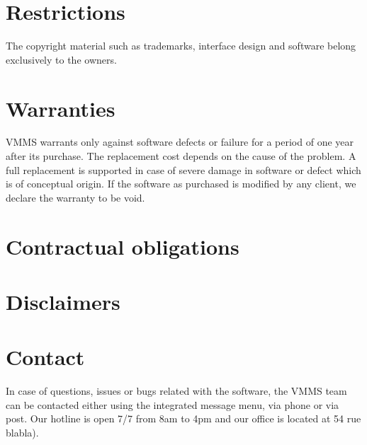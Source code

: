 \section{Restrictions}
The copyright material such as trademarks, interface design and software belong
exclusively to the owners.

\section{Warranties}
VMMS warrants only against software defects or failure for a period of one year
after its purchase. The replacement cost depends on the cause of the problem. A
full replacement is supported in case of severe damage in software or defect
which is of conceptual origin. If the software as purchased is modified by any
client, we declare the warranty to be void. 

\section{Contractual obligations}

\section{Disclaimers}

\section{Contact}
In case of questions, issues or bugs related with the software, the VMMS team
can be contacted either using the integrated message menu, via phone or via
post. Our hotline is open 7/7 from 8am to 4pm and our office is located
at 54 rue blabla).

